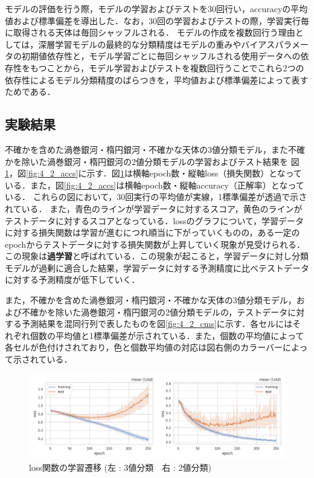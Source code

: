\documentclass[a4j, 11pt]{jreport}
\begin{document}
モデルの評価を行う際，モデルの学習およびテストを30回行い，accuracyの平均値および標準偏差を導出した．なお，30回の学習およびテストの際，学習実行毎に取得される天体は毎回シャッフルされる．
モデルの作成を複数回行う理由としては，深層学習モデルの最終的な分類精度はモデルの重みやバイアスパラメータの初期値依存性と，モデル学習ごとに毎回シャッフルされる使用データへの依存性をもつことから，モデル学習およびテストを複数回行うことでこれら2つの依存性によるモデル分類精度のばらつきを，平均値および標準偏差によって表すためである．


\subsection{実験結果}
不確かを含めた渦巻銀河・楕円銀河・不確かな天体の3値分類モデル，また不確かを除いた渦巻銀河・楕円銀河の2値分類モデルの学習およびテスト結果を
図\ref{fig:4_2_losses}，図\ref{fig:4_2_accs}に示す．図\ref{fig:4_2_losses}は横軸epoch数・縦軸loss（損失関数）となっている．また，図\ref{fig:4_2_accs}は横軸epoch数・縦軸accuracy（正解率）となっている．
これらの図において，30回実行の平均値が実線，1標準偏差が透過で示されている．
また，青色のラインが学習データに対するスコア，黄色のラインがテストデータに対するスコアとなっている．lossのグラフについて，学習データに対する損失関数は学習が進むにつれ順当に下がっていくものの，ある一定のepochからテストデータに対する損失関数が上昇していく現象が見受けられる．この現象は\textbf{過学習}と呼ばれている．この現象が起こると，学習データに対し分類モデルが過剰に適合した結果，学習データに対する予測精度に比べテストデータに対する予測精度が低下していく．

また，不確かを含めた渦巻銀河・楕円銀河・不確かな天体の3値分類モデル，および不確かを除いた渦巻銀河・楕円銀河の2値分類モデルの，テストデータに対する予測結果を混同行列で表したものを図\ref{fig:4_2_cms}に示す．各セルにはそれぞれ個数の平均値と1標準偏差が示されている．また，個数の平均値によって各セルが色付けされており，色と個数平均値の対応は図右側のカラーバーによって示されている．


\begin{figure}[H]
 \centering
 \includegraphics[width=1\hsize, keepaspectratio]{images/drawio/4_2_losses.png}
 \caption{loss関数の学習遷移 (左 : 3値分類　右 : 2値分類)}
 \label{fig:4_2_losses}
\end{figure}
\end{document}
